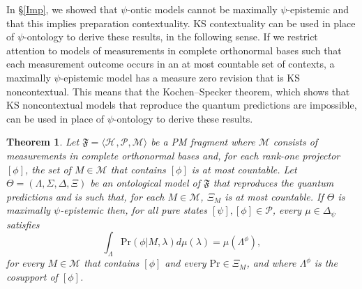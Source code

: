 \documentclass[DIV=calc,paper=a4,fontsize=11pt,twocolumn]{scrartcl} %
\theoremstyle{definition}
\theoremstyle{plain}
\newtheorem{theorem}[definition]{Theorem}
\newcommand{\Proj}[1]{\ensuremath{\left [ #1 \right ]}}
\newcommand{\Hilb}[1][]{\ensuremath{\mathcal{H}_{#1}}}
\begin{document}
In \S\ref{Imp}, we showed that $\psi$-ontic models cannot be maximally
$\psi$-epistemic and that this implies preparation contextuality.  KS
contextuality can be used in place of $\psi$-ontology to derive these
results, in the following sense.  If we restrict attention to models
of measurements in complete orthonormal bases such that each
measurement outcome occurs in an at most countable set of contexts, a
maximally $\psi$-epistemic model has a measure zero revision that is KS
noncontextual.  This means that the Kochen--Specker theorem, which
shows that KS noncontextual models that reproduce the quantum
predictions are impossible, can be used in place of $\psi$-ontology to
derive these results.

\begin{theorem}
\label{prop:ME:char}
Let $\mathfrak{F} = \langle \Hilb, \mathcal{P}, \mathcal{M} \rangle$
be a PM fragment where $\mathcal{M}$ consists of measurements in
complete orthonormal bases and, for each rank-one projector
$\Proj{\phi}$, the set of $M \in \mathcal{M}$ that contains
$\Proj{\phi}$ is at most countable.  Let $\Theta = (\Lambda, \Sigma,
\Delta, \Xi)$ be an ontological model of $\mathfrak{F}$ that
reproduces the quantum predictions and is such that, for each $M \in
\mathcal{M}$, $\Xi_M$ is at most countable.  If $\Theta$ is
maximally $\psi$-epistemic then, for all pure states $\Proj{\psi},
\Proj{\phi} \in \mathcal{P}$, every $\mu \in \Delta_{\psi}$
satisfies
\begin{equation}
\label{eq:ME:KS}
\int_{\Lambda} \text{Pr}(\phi|M,\lambda) d \mu(\lambda) =
\mu(\Lambda^{\phi}),
\end{equation}
for every $M \in \mathcal{M}$ that contains $\Proj{\phi}$ and every
$\text{Pr} \in \Xi_M$, and where $\Lambda^{\phi}$ is the cosupport
of $\Proj{\phi}$.
\end{theorem}
\end{document}
